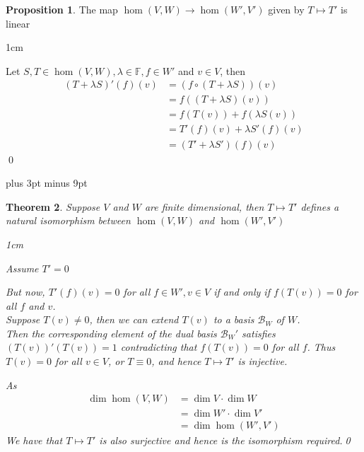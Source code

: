 \documentclass[11pt, a4paper]{report}
\makeatletter
\numberwithin{equation}{section}
\newcommand{\B}{\mathcal{B}}
\newcommand{\F}{\mathbb{F}}
\numberwithin{equation}{subsection}
\theoremstyle{plain}
\newtheorem{thm}{Theorem}[chapter] %
\theoremstyle{definition}
\newtheorem{prop}[thm]{Proposition}
\theoremstyle{remark}
\newtheorem*{prf}{Proof}
\renewenvironment{prf}[1][\proofname]{\par
  \vspace{-\topsep}%
  \normalfont
  \topsep0pt \partopsep0pt %
  \trivlist
  \item[\hskip\labelsep
        \itshape
    #1\@addpunct{.}]\ignorespaces
}{%
  \popQED\endtrivlist\@endpefalse
  \addvspace{6pt plus 6pt} %
}
\newcommand{\pr}[1]{\begin{adjustwidth}{1cm}{} \begin{prf} #1 \end{prf} \end{adjustwidth}}
\makeatother
\begin{document}
\begin{prop}
The map $\hom(V,W) \to \hom(W',V')$ given by $T \mapsto T'$ is linear

\pr{
Let $S,T \in \hom(V,W), \lambda \in \F, f \in W'$ and $v \in V$, then
\begin{align*}
(T + \lambda S)'(f)(v)	&= (f \circ (T + \lambda S))(v)\\
						&= f((T + \lambda S)(v))\\
						&= f(T(v)) + f(\lambda S(v))\\
						&= T'(f)(v) + \lambda S'(f)(v)\\
						&= (T' + \lambda S')(f)(v)
\end{align*}\vspace{-8pt}\qed
}
\end{prop}
\belowdisplayskip=12pt plus 3pt minus 9pt
\begin{thm}
Suppose $V$ and $W$ are finite dimensional, then $T \mapsto T'$ defines a natural isomorphism between $\hom(V,W)$ and $\hom(W',V')$

\pr{
Assume $T' = 0$

But now, $T'(f)(v) = 0$ for all $f \in W', v \in V$ if and only if $f(T(v)) = 0$ for all $f$ and $v$.\\ Suppose $T(v) \neq 0$, then we can extend $T(v)$ to a basis $\B_W$ of $W$.\\ Then the corresponding element of the dual basis $\B_W'$ satisfies $(T(v))'(T(v)) = 1$ contradicting that $f(T(v)) = 0$ for all $f$. Thus $T(v) = 0$ for all $v \in V$, or $T \equiv 0$, and hence $T \mapsto T'$ is injective.

As
\begin{align*}
\dim \hom(V,W)	&= \dim V \cdot \dim W\\
				&= \dim W' \cdot \dim V'\\
				&= \dim \hom(W',V')
\end{align*}
We have that $T \mapsto T'$ is also surjective and hence is the isomorphism required.\qed
}

\end{thm}
\end{document}
